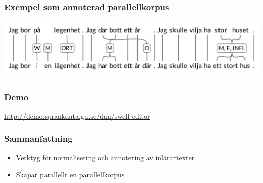 \documentclass[ignorenonframetext,]{beamer}
\begin{document}
\begin{frame}
\frametitle{Exempel som annoterad parallellkorpus}
\includegraphics[width=\textwidth]{labelled_ladder_black.pdf}
\end{frame}

\begin{frame}[fragile]
\frametitle{Demo}
\begin{center}
\large
\url{http://demo.spraakdata.gu.se/dan/swell-editor}
\end{center}
\end{frame}

\begin{frame}
\frametitle{Sammanfattning}
\begin{itemize}
\item Verktyg för normalisering och annotering av inlärartexter
\item Skapar parallellt en parallellkorpus
\end{itemize}
\end{frame}
\end{document}
